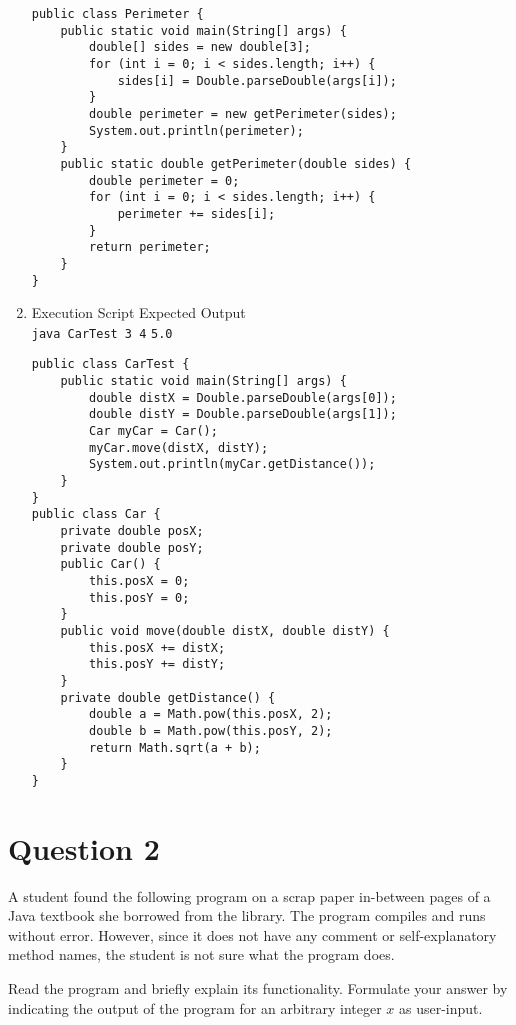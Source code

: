 \documentclass[12pt,letterpaper,twoside]{article}
\begin{document}
\begin{enumerate}[label=\textbf{(\alph*)}]
\begin{lstlisting}
public class Perimeter {
	public static void main(String[] args) {
		double[] sides = new double[3];
		for (int i = 0; i < sides.length; i++) {
			sides[i] = Double.parseDouble(args[i]);
		}
		double perimeter = new getPerimeter(sides);
		System.out.println(perimeter);
	}
	public static double getPerimeter(double sides) {
		double perimeter = 0;
		for (int i = 0; i < sides.length; i++) {
			perimeter += sides[i];
		}
		return perimeter;
	}
}
\end{lstlisting}

\newpage

\item Execution Script \hfill Expected Output\\
\texttt{java CarTest 3 4} \hfill \texttt{5.0}

\begin{lstlisting}
public class CarTest {
	public static void main(String[] args) {
		double distX = Double.parseDouble(args[0]);
		double distY = Double.parseDouble(args[1]);
		Car myCar = Car();
		myCar.move(distX, distY);
		System.out.println(myCar.getDistance());
	}
}
public class Car {
	private double posX;
	private double posY;
	public Car() {
		this.posX = 0;
		this.posY = 0;
	}
	public void move(double distX, double distY) {
		this.posX += distX;
		this.posY += distY;
	}
	private double getDistance() {
		double a = Math.pow(this.posX, 2);
		double b = Math.pow(this.posY, 2);
		return Math.sqrt(a + b);
	}
}
\end{lstlisting}

\end{enumerate}

\newpage

\section*{Question 2}

A student found the following program on a scrap paper in-between pages of a Java textbook she borrowed from the library.
The program compiles and runs without error.
However, since it does not have any comment or self-explanatory method names, the student is not sure what the program does.

Read the program and briefly explain its functionality.
Formulate your answer by indicating the output of the program for an arbitrary integer $x$ as user-input.


\end{document}
